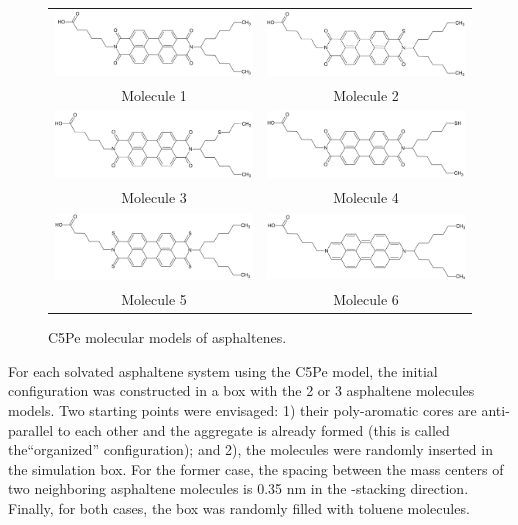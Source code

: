 \begin{figure}[htb]
	\centering
	\begin{tabular}{cc}
		\includegraphics[width=0.45\columnwidth]{image/1} &
		\includegraphics[width=0.45\columnwidth]{image/2}\\
		Molecule 1 & Molecule 2\\
		\includegraphics[width=0.45\columnwidth]{image/3} &
		\includegraphics[width=0.45\columnwidth]{image/4}\\
		Molecule 3 & Molecule 4\\
		\includegraphics[width=0.45\columnwidth]{image/5} &
		\includegraphics[width=0.45\columnwidth]{image/6}\\
		Molecule 5 & Molecule 6\\        
	\end{tabular}
	\caption{C5Pe molecular models of asphaltenes. }
	\label{pap:fig01}
\end{figure}

For each solvated asphaltene system using the C5Pe model, the initial configuration was constructed in a box with the 2 or 3 asphaltene molecules models. Two starting points were envisaged: 1) their poly-aromatic cores are anti-parallel to each other and the aggregate is already formed (this is called the``organized'' configuration); and 2), the molecules were randomly inserted in the simulation box. For the former case, the spacing between the mass centers of two neighboring asphaltene molecules is 0.35 nm in the -stacking direction. Finally, for both cases, the box was randomly filled with toluene molecules.\\

